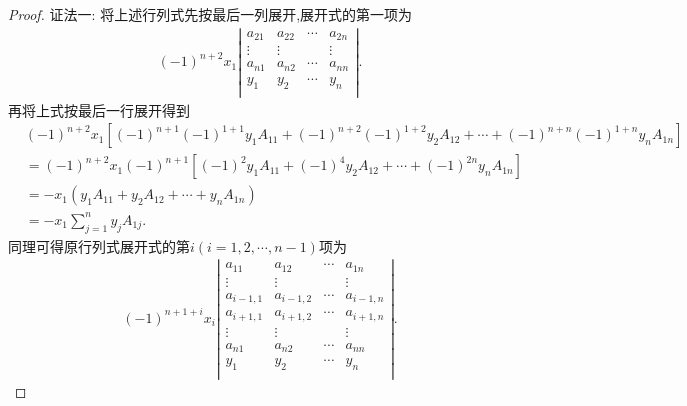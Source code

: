 \documentclass[../../main.tex]{subfiles}
\begin{document}
\begin{proof}
{\color{blue}证法一:}
将上述行列式先按最后一列展开,展开式的第一项为
\begin{equation}
\begin{split}
\left( -1 \right) ^{n+2}x_1\left| \begin{matrix}
a_{21}&		a_{22}&		\cdots&		a_{2n}\\
\vdots&		\vdots&		&		\vdots\\
a_{n1}&		a_{n2}&		\cdots&		a_{nn}\\
y_1&		y_2&		\cdots&		y_n\\
\end{matrix} \right|.
\end{split}
\nonumber
\end{equation}
再将上式按最后一行展开得到
\begin{equation}
\begin{split}
&\left( -1 \right) ^{n+2}x_1\left[ \left( -1 \right) ^{n+1}\left( -1 \right) ^{1+1}y_1A_{11}+\left( -1 \right) ^{n+2}\left( -1 \right) ^{1+2}y_2A_{12}+\cdots +\left( -1 \right) ^{n+n}\left( -1 \right) ^{1+n}y_nA_{1n} \right]
\\
&=\left( -1 \right) ^{n+2}x_1\left( -1 \right) ^{n+1}\left[ \left( -1 \right) ^2y_1A_{11}+\left( -1 \right) ^4y_2A_{12}+\cdots +\left( -1 \right) ^{2n}y_nA_{1n} \right] 
\\
&=-x_1\left( y_1A_{11}+y_2A_{12}+\cdots +y_nA_{1n} \right)
\\
&=-x_1\sum_{j=1}^n{y_jA_{1j}}.            
\end{split}
\nonumber
\end{equation}
同理可得原行列式展开式的第$i(i=1,2,\cdots,n-1)$项为
\begin{equation}
\begin{split}
\left( -1 \right) ^{n+1+i}x_i\left| \begin{matrix}
a_{11}&		a_{12}&		\cdots&		a_{1n}\\
\vdots&		\vdots&		&		\vdots\\
a_{i-1,1}&		a_{i-1,2}&		\cdots&		a_{i-1,n}\\
a_{i+1,1}&		a_{i+1,2}&		\cdots&		a_{i+1,n}\\
\vdots&		\vdots&		&		\vdots\\
a_{n1}&		a_{n2}&		\cdots&		a_{nn}\\
y_1&		y_2&		\cdots&		y_n\\
\end{matrix} \right|.
\end{split}
\nonumber
\end{equation}

\end{proof}
\end{document}
